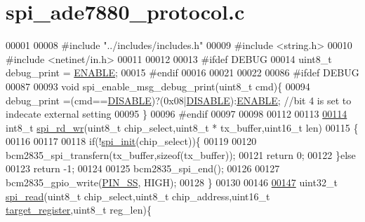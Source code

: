 \hypertarget{a00040}{\section{spi\-\_\-ade7880\-\_\-protocol.\-c}
\label{db/d3a/a00040}
}

\begin{DoxyCode}
00001    
00008 \textcolor{preprocessor}{#include "../includes/includes.h"}
00009 \textcolor{preprocessor}{#include <string.h>}
00010 \textcolor{preprocessor}{#include <netinet/in.h>} 
00011 
00012 
00013 \textcolor{preprocessor}{#ifdef DEBUG}
00014 \textcolor{preprocessor}{}uint8\_t debug\_print = \hyperlink{a00037_a514ad415fb6125ba296793df7d1a468a}{ENABLE};
00015 \textcolor{preprocessor}{#endif}
00016 \textcolor{preprocessor}{}
00021 
00022 
00086 \textcolor{preprocessor}{#ifdef DEBUG}
00087 \textcolor{preprocessor}{}
00093 \textcolor{keywordtype}{void} spi\_enable\_msg\_debug\_print(uint8\_t cmd)\{
00094     debug\_print =(cmd==\hyperlink{a00037_a99496f7308834e8b220f7894efa0b6ab}{DISABLE})?(0x08|\hyperlink{a00037_a99496f7308834e8b220f7894efa0b6ab}{DISABLE}):\hyperlink{a00037_a514ad415fb6125ba296793df7d1a468a}{ENABLE}; \textcolor{comment}{//bit 4 is set to indecate
       external setting }
00095 \}
00096 \textcolor{preprocessor}{#endif}
00097 \textcolor{preprocessor}{}
00098 
00112 
00113    
\hypertarget{a00040_source_l00114}{}\hyperlink{a00007_gadd297682b87478aed2d07f4f536353c1}{00114} int8\_t  \hyperlink{a00007_gadd297682b87478aed2d07f4f536353c1}{spi\_rd\_wr}(uint8\_t chip\_select,uint8\_t * tx\_buffer,uint16\_t len)
00115 \{
00116    
00117        
00118        \textcolor{keywordflow}{if}(!\hyperlink{a00005_ga96ddfd5c89b80852982ba50dd18256f6}{spi\_init}(chip\_select))\{
00119     
00120           bcm2835\_spi\_transfern(tx\_buffer,\textcolor{keyword}{sizeof}(tx\_buffer));      
00121           \textcolor{keywordflow}{return} 0;       
00122        \}\textcolor{keywordflow}{else}
00123           \textcolor{keywordflow}{return} -1;
00124     
00125        bcm2835\_spi\_end();
00126        
00127        bcm2835\_gpio\_write(\hyperlink{a00039_ab4b553591a495409d4f7cec4b6c3e754}{PIN\_SS}, HIGH);     
00128 \}
00130 
00146 
\hypertarget{a00040_source_l00147}{}\hyperlink{a00007_ga7ad9f65ee46aca507374096506a0b1c4}{00147} uint32\_t \hyperlink{a00007_ga7ad9f65ee46aca507374096506a0b1c4}{spi\_read}(uint8\_t chip\_select,uint8\_t chip\_address,uint16\_t 
      \hyperlink{a00041_ac02048009fa6718e40f028b6bae63f3d}{target\_register},uint8\_t reg\_len)\{

\end{DoxyCode}
